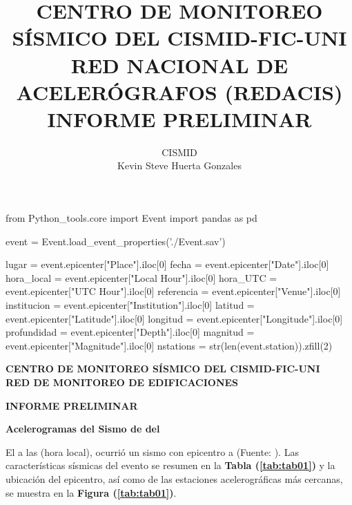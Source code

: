 \documentclass[11pt, a4paper]{report}
\author{CISMID\\Kevin Steve Huerta Gonzales}
\title{CENTRO DE MONITOREO SÍSMICO DEL CISMID-FIC-UNI \\
RED NACIONAL DE ACELERÓGRAFOS (REDACIS)\\
INFORME PRELIMINAR\\
}
\begin{document}




\begin{pycode}
from Python_tools.core import Event
import pandas as pd

event = Event.load_event_properties('./Event.sav')

lugar = event.epicenter["Place"].iloc[0]
fecha = event.epicenter["Date"].iloc[0]
hora_local = event.epicenter["Local Hour"].iloc[0]
hora_UTC = event.epicenter["UTC Hour"].iloc[0]
referencia = event.epicenter["Venue"].iloc[0]
institucion = event.epicenter["Institution"].iloc[0]
latitud = event.epicenter["Latitude"].iloc[0]
longitud = event.epicenter["Longitude"].iloc[0]
profundidad =  event.epicenter["Depth"].iloc[0]
magnitud = event.epicenter["Magnitude"].iloc[0]
nstations = str(len(event.station)).zfill(2)

\end{pycode}

\begin{center}
\centering 
\textbf{CENTRO DE MONITOREO SÍSMICO DEL CISMID-FIC-UNI \\
RED DE MONITOREO DE EDIFICACIONES\\}
\vspace{0.3cm}

\textbf{INFORME PRELIMINAR\\}
\vspace{0.3cm}

\textbf{Acelerogramas del Sismo de  del }
\vspace{0.25cm}
\end{center}

El  a las  (hora local), ocurrió un sismo con epicentro a  (Fuente: ). Las características sísmicas del evento 
se resumen en la \textbf{Tabla (\ref{tab:tab01})} y la ubicación del epicentro, así como de las estaciones 
acelerográficas más cercanas, se muestra en la \textbf{Figura (\ref{tab:tab01})}. \\
\end{document}
